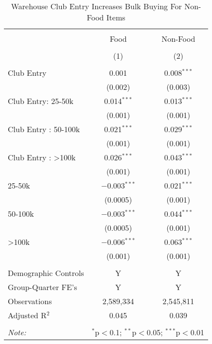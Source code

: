 
\begin{table}[!htbp] \centering 
  \caption{Warehouse Club Entry Increases Bulk Buying For Non-Food Items} 
  \label{tab:costcoEntry} 
\begin{tabular}{@{\extracolsep{5pt}}lcc} 
\\[-1.8ex]\hline 
\hline \\[-1.8ex] 
 & Food & Non-Food \\ 
\\[-1.8ex] & (1) & (2)\\ 
\hline \\[-1.8ex] 
 Club Entry & 0.001 & 0.008$^{***}$ \\ 
  & (0.002) & (0.003) \\ 
  Club Entry: 25-50k & 0.014$^{***}$ & 0.013$^{***}$ \\ 
  & (0.001) & (0.001) \\ 
  Club Entry : 50-100k & 0.021$^{***}$ & 0.029$^{***}$ \\ 
  & (0.001) & (0.001) \\ 
  Club Entry : >100k & 0.026$^{***}$ & 0.043$^{***}$ \\ 
  & (0.001) & (0.001) \\ 
  25-50k & $-$0.003$^{***}$ & 0.021$^{***}$ \\ 
  & (0.0005) & (0.001) \\ 
  50-100k & $-$0.003$^{***}$ & 0.044$^{***}$ \\ 
  & (0.0005) & (0.001) \\ 
  >100k & $-$0.006$^{***}$ & 0.063$^{***}$ \\ 
  & (0.001) & (0.001) \\ 
 \hline \\[-1.8ex] 
Demographic Controls & Y & Y \\ 
Group-Quarter FE's & Y & Y \\ 
Observations & 2,589,334 & 2,545,811 \\ 
Adjusted R$^{2}$ & 0.045 & 0.039 \\ 
\hline 
\hline \\[-1.8ex] 
\textit{Note:}  & \multicolumn{2}{l}{$^{*}$p$<$0.1; $^{**}$p$<$0.05; $^{***}$p$<$0.01} \\ 
\end{tabular} 
\end{table} 

